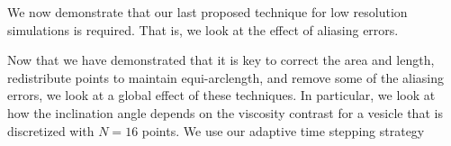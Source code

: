 We now demonstrate that our last proposed technique for low resolution
simulations is required.  That is, we look at the effect of aliasing
errors.  

Now that we have demonstrated that it is key to correct the area and
length, redistribute points to maintain equi-arclength, and remove some
of the aliasing errors, we look at a global effect of these techniques.
In particular, we look at how the inclination angle depends on the
viscosity contrast for a vesicle that is discretized with $N=16$ points.
We use our adaptive time stepping strategy~\cite{qua:bir2014b}


%
%
%
%
%


